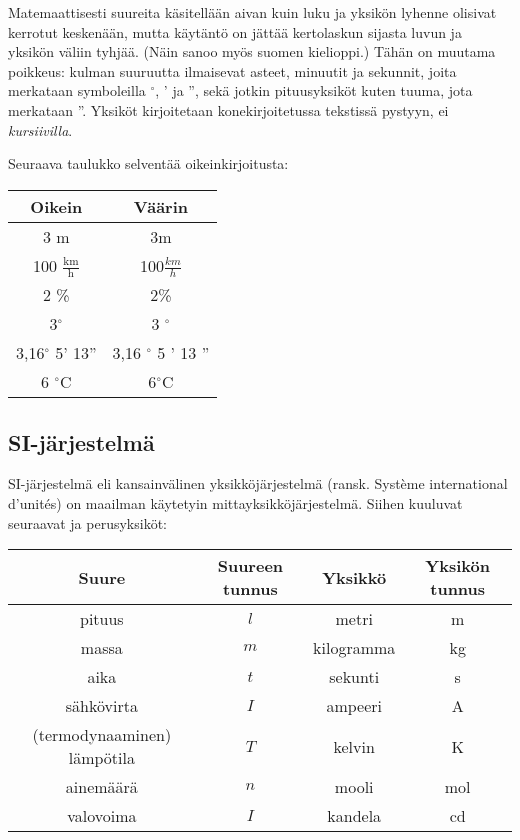 
Matemaattisesti suureita käsitellään aivan kuin luku ja yksikön lyhenne olisivat kerrotut keskenään, mutta käytäntö on jättää kertolaskun sijasta luvun ja yksikön väliin tyhjää. (Näin sanoo myös suomen kielioppi.) Tähän on muutama poikkeus: kulman suuruutta ilmaisevat asteet, minuutit ja sekunnit, joita merkataan symboleilla $^\circ$, ' ja '', sekä jotkin pituusyksiköt kuten tuuma, jota merkataan ''. Yksiköt kirjoitetaan konekirjoitetussa tekstissä pystyyn, ei \textit{kursiivilla}.



Seuraava taulukko selventää oikeinkirjoitusta:

\begin{tabular}{c|c}
Oikein & Väärin \\
\hline
3 m & 3m 	\\
100 $\frac{\text{km}}{\text{h}}$ & 100$\frac{km}{h}$	\\
2 \% & 2\% 	\\
3$^\circ$ & 3 $^\circ$\\
3,16$^\circ$ 5' 13'' & 3,16 $^\circ$ 5 ' 13 '' 	\\
6 $^\circ$C & 6$^\circ$C 	\\
\end{tabular}


\subsection*{SI-järjestelmä}

SI-järjestelmä eli kansainvälinen yksikköjärjestelmä (ransk. Système international d'unités) on maailman käytetyin mittayksikköjärjestelmä. Siihen kuuluvat seuraavat  ja perusyksiköt:

\begin{tabular}{c|c|c|c}
Suure & Suureen tunnus & Yksikkö & Yksikön tunnus\\
\hline
pituus & $l$ & metri &	m\\
massa & $m$ &kilogramma & kg 	\\
aika & $t$ & sekunti & s \\
sähkövirta & $I$ & ampeeri & A \\
(termodynaaminen) lämpötila & $T$ & kelvin & K \\
ainemäärä & $n$ & mooli & mol \\
valovoima & $I$ & kandela & cd
\end{tabular}

